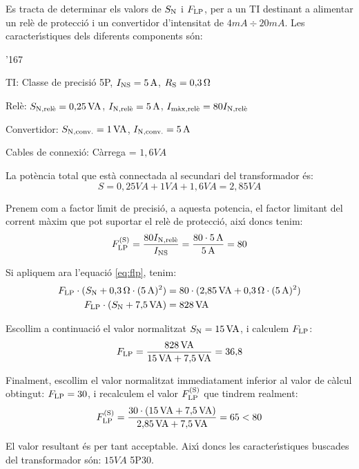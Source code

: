 \begin{exemple}

Es tracta de determinar els valors de $S_\mathrm{N}$ i $F_\mathrm{LP}$,  per
a un TI destinant a alimentar  un rel\`{e} de protecci\'{o} i un convertidor
d'intensitat de $4\unit{mA}\div20\unit{mA}$. Les caracter\'{\i}stiques
dels diferents components s\'{o}n:
\begin{dinglist}{'167}
    \item TI: Classe de precisi\'{o}  5P, $I_\mathrm{NS}=5\mathrm{\,A}$,
    $R_\mathrm{S}=0{,}3\mathrm{\,\mathrm{\Omega}}$
    \item Rel\`{e}: $S_\mathrm{N,rel\grave{e}}=0{,}25\mathrm{\,VA}$,
    $I_\mathrm{N,rel\grave{e}}=5\mathrm{\,A}$, $I_\mathrm{m\grave{a}x,rel\grave{e}}=
    80 I_\mathrm{N,rel\grave{e}}$
    \item Convertidor: $S_\mathrm{N,conv.}=1\mathrm{\,VA}$,
    $I_\mathrm{N,conv.}=5\mathrm{\,A}$
    \item Cables de connexi\'{o}: C\`{a}rrega = $1{,}6\unit{VA}$
\end{dinglist}

La pot\`{e}ncia total que est\`{a} connectada al secundari del transformador
\'{e}s:
\[
    S = 0{,}25\unit{VA} + 1\unit{VA} + 1{,}6\unit{VA} = 2{,}85\unit{VA}
\]

Prenem com a factor l\'{\i}mit de precisi\'{o},  a aquesta potencia, el
factor limitant del corrent m\`{a}xim que pot suportar el rel\`{e} de
protecci\'{o}, aix\'{\i} doncs tenim:
\[
    F_\mathrm{LP}^\mathrm{(S)} = \frac{80 I_\mathrm{N,rel\grave{e}}}{I_\mathrm{NS}} =
    \frac{80\cdot5\mathrm{\,A}}{5\mathrm{\,A}} = 80
\]

Si apliquem ara l'equaci\'{o} \eqref{eq:flp}, tenim:
\begin{align*}
    F_\mathrm{LP}\cdot(S_\mathrm{N}+0{,}3\mathrm{\,\mathrm{\Omega}} \cdot (5\mathrm{\,A})^2) &=
    80\cdot(2{,}85\mathrm{\,VA}+0{,}3\mathrm{\,\mathrm{\Omega}} \cdot (5\mathrm{\,A})^2) \\
    F_\mathrm{LP}\cdot(S_\mathrm{N}+7{,}5\mathrm{\,VA}) &= 828\mathrm{\,VA}
\end{align*}

Escollim a continuaci\'{o} el valor normalitzat $S_\mathrm{N}=
15\mathrm{\,VA}$, i calculem $F_\mathrm{LP}$:
\[
    F_\mathrm{LP} = \frac{828\mathrm{\,VA}}{15\mathrm{\,VA}+7{,}5\mathrm{\,VA}}
    = 36{,}8
\]

Finalment, escollim el valor normalitzat immediatament inferior al valor
de c\`{a}lcul obtingut: $F_\mathrm{LP} = 30$, i
recalculem el valor $F_\mathrm{LP}^\mathrm{(S)}$ que tindrem realment:
\[
    F_\mathrm{LP}^\mathrm{(S)} = \frac{30\cdot(15\mathrm{\,VA} + 7{,}5\mathrm{\,VA})}
    {2{,}85\mathrm{\,VA} + 7{,}5\mathrm{\,VA}} = 65 < 80
    \]

    El valor resultant \'{e}s per tant acceptable. Aix\'{\i} doncs les
    caracter\'{\i}stiques buscades del transformador s\'{o}n: $15\unit{VA}$ 5P30.

\end{exemple}

